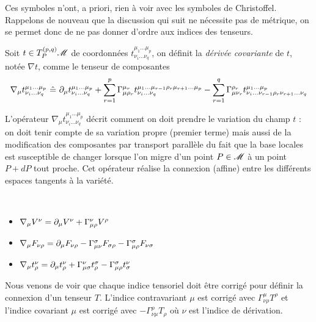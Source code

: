 \documentclass[a4paper,11pt]{report}
\begin{document}
                Ces symboles n'ont, a priori, rien à voir avec les symboles de Christoffel. Rappelons de nouveau que la discussion qui suit ne nécessite pas de métrique, on se permet donc de ne pas donner d'ordre aux indices des tenseurs.
                
                \begin{defn}
                    Soit $t\in T_P^{(p,q)}\mathscr{M}$ de coordonnées $t^{\mu_1\dots\mu_p}_{\nu_i\dots\nu_q}$, on définit la \textit{dérivée covariante} de $t$, notée $\nabla t$, comme le tenseur de composantes
                    \begin{equation}
                        \nabla_\mu t^{\mu_1\dots\mu_p}_{\nu_i\dots\nu_q} ~\hat{=}~ \partial_\mu t^{\mu_1\dots\mu_p}_{\nu_i\dots\nu_q}+\sum_{r=1}^p \Gamma^{\mu_r}_{\mu\rho_r}t^{\mu_1\dots\mu_{r-1}\rho_r\mu_{r+1}\dots\mu_p}_{\nu_i\dots\nu_q} - \sum_{r=1}^q \Gamma^{\rho_r}_{\mu\nu_r}t^{\mu_1\dots\mu_p}_{\nu_i\dots\nu_{r-1}\rho_r\nu_{r+1}\dots\nu_q}
                    \end{equation}
                \end{defn}
                
                L'opérateur $\nabla_\mu t^{\mu_1\dots\mu_p}_{\nu_i\dots\nu_q}$ décrit comment on doit prendre le variation du champ $t$ :  on doit tenir compte de sa variation propre (premier terme) mais aussi de la modification des composantes par transport parallèle du fait que la base locales est susceptible de changer lorsque l'on migre d'un point $P\in\mathscr{M}$ à un point $P+dP$ tout proche. Cet opérateur réalise la connexion (affine) entre les différents espaces tangents à la variété.
                
                \begin{exmp}${}$
                    \begin{itemize}[label = \textbullet]
                        \item $\nabla_\mu V^\nu = \partial_\mu V^\nu + \Gamma^\nu_{\mu\rho} V^\rho$
                        \item $\nabla_\mu F_{\nu\rho} = \partial_\mu F_{\nu\rho}-\Gamma^\sigma_{\mu\nu}F_{\sigma\rho}-\Gamma^{\sigma}_{\mu\rho}F_{\nu\sigma}$
                        \item $\nabla_\mu t^\nu_\rho = \partial_\mu t^\nu_\rho+\Gamma^\nu_{\mu\sigma}t^\sigma_\rho - \Gamma^\sigma_{\mu\rho}t^\nu_\sigma$
                    \end{itemize}
                    Nous venons de voir que chaque indice tensoriel doit être corrigé pour définir la connexion d'un tenseur $T$. L'indice contravariant $\mu$ est corrigé avec $\Gamma^\mu_{\nu\rho}T^\rho$ et l'indice covariant $\mu$ est corrigé avec $-\Gamma^\rho_{\nu\mu}T_\rho$ où $\nu$ est l'indice de dérivation.
                \end{exmp}
                
\end{document}

